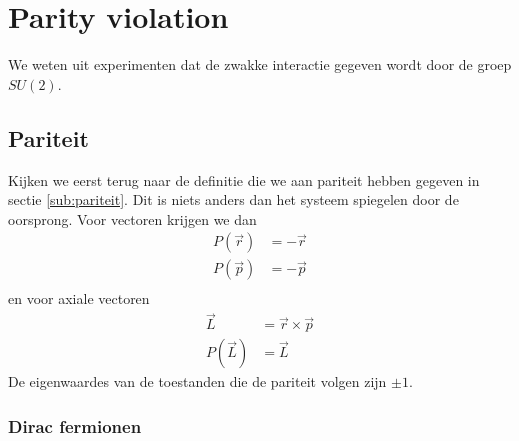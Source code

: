 \documentclass[../main.tex]{subfiles}
\begin{document}
\section{Parity violation}%
\label{sec:parity_violation}

We weten uit experimenten dat de zwakke interactie gegeven wordt door de groep $SU(2)$.

\subsection{Pariteit}%
\label{sub:pariteit_rev}

Kijken we eerst terug naar de definitie die we aan pariteit hebben gegeven in sectie \ref{sub:pariteit}. Dit is niets anders dan het systeem spiegelen door de oorsprong. Voor vectoren krijgen we dan
\begin{equation}
    \begin{aligned}
        \label{eq:pariteit_rev}
        P(\vec{r}) &= -\vec{r}\\
        P(\vec{p}) &= -\vec{p}\\
    \end{aligned}
\end{equation}
en voor axiale vectoren
\begin{equation}
    \begin{aligned}
        \label{eq:pariteit_ax}
        \vec{L} &= \vec{r} \times \vec{p}\\
        P(\vec{L}) &= \vec{L}
    \end{aligned}
\end{equation}
De eigenwaardes van de toestanden die de pariteit volgen zijn $\pm 1$.

\subsubsection{Dirac fermionen}%
\label{ssub:dirac_fermionen}
\end{document}
